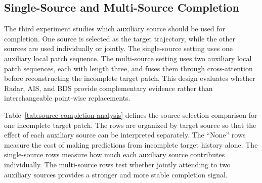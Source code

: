 \subsection{Single-Source and Multi-Source Completion}
\label{subsec:source-completion-analysis}

The third experiment studies which auxiliary source should be used for completion. One source is selected as the target trajectory, while the other sources are used individually or jointly. The single-source setting uses one auxiliary local patch sequence. The multi-source setting uses two auxiliary local patch sequences, each with length three, and fuses them through cross-attention before reconstructing the incomplete target patch. This design evaluates whether Radar, AIS, and BDS provide complementary evidence rather than interchangeable point-wise replacements.

Table~\ref{tab:source-completion-analysis} defines the source-selection comparison for one incomplete target patch. The rows are organized by target source so that the effect of each auxiliary source can be interpreted separately. The ``None'' rows measure the cost of making predictions from incomplete target history alone. The single-source rows measure how much each auxiliary source contributes individually. The multi-source rows test whether jointly attending to two auxiliary sources provides a stronger and more stable completion signal.

